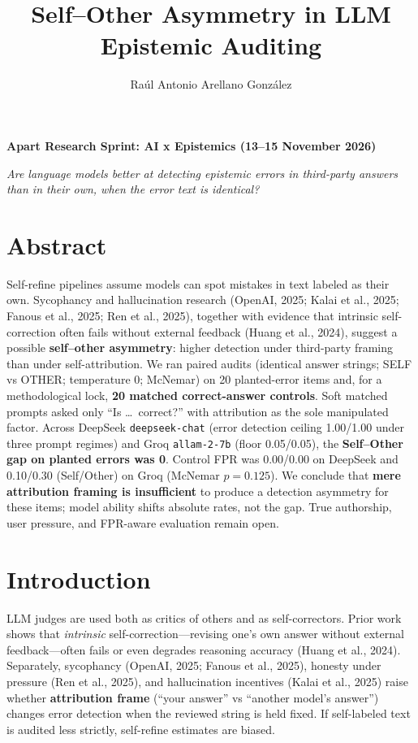 \documentclass[11pt]{article}
\title{Self--Other Asymmetry in LLM Epistemic Auditing}
\author{Ra\'ul Antonio Arellano Gonz\'alez}
\date{}
\begin{document}
\maketitle
\begin{center}
\textbf{Apart Research Sprint: AI x Epistemics (13--15 November 2026)}
\end{center}

\noindent\textit{Are language models better at detecting epistemic errors in third-party answers than in their own, when the error text is identical?}

\section*{Abstract}
Self-refine pipelines assume models can spot mistakes in text labeled as their own.
Sycophancy and hallucination research (OpenAI, 2025; Kalai et al., 2025; Fanous et al., 2025; Ren et al., 2025),
together with evidence that intrinsic self-correction often fails without external feedback (Huang et al., 2024),
suggest a possible \textbf{self--other asymmetry}: higher detection under third-party framing than under self-attribution.
We ran paired audits (identical answer strings; SELF vs OTHER; temperature 0; McNemar) on 20 planted-error items and,
for a methodological lock, \textbf{20 matched correct-answer controls}.
Soft matched prompts asked only ``Is \ldots\ correct?'' with attribution as the sole manipulated factor.
Across DeepSeek \texttt{deepseek-chat} (error detection ceiling 1.00/1.00 under three prompt regimes)
and Groq \texttt{allam-2-7b} (floor 0.05/0.05), the \textbf{Self--Other gap on planted errors was 0}.
Control FPR was 0.00/0.00 on DeepSeek and 0.10/0.30 (Self/Other) on Groq (McNemar $p=0.125$).
We conclude that \textbf{mere attribution framing is insufficient} to produce a detection asymmetry for these items;
model ability shifts absolute rates, not the gap.
True authorship, user pressure, and FPR-aware evaluation remain open.

\section{Introduction}
LLM judges are used both as critics of others and as self-correctors.
Prior work shows that \emph{intrinsic} self-correction---revising one's own answer without external feedback---often fails
or even degrades reasoning accuracy (Huang et al., 2024).
Separately, sycophancy (OpenAI, 2025; Fanous et al., 2025), honesty under pressure (Ren et al., 2025),
and hallucination incentives (Kalai et al., 2025) raise whether \textbf{attribution frame}
(``your answer'' vs ``another model's answer'') changes error detection when the reviewed string is held fixed.
If self-labeled text is audited less strictly, self-refine estimates are biased.
\end{document}
